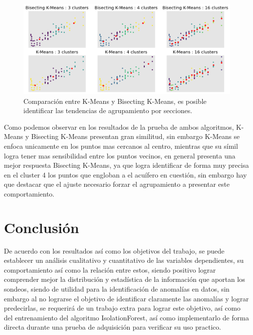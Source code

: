 \documentclass[sn-mathphys,Numbered]{sn-jnl}%
\theoremstyle{thmstyleone}%
\theoremstyle{thmstyletwo}%
\theoremstyle{thmstylethree}%
\begin{document}
\begin{figure}[H]
	\centering
	\includegraphics[width=1.1\linewidth]{imagenes/KMeans}
	\caption[Figura]{Comparación entre K-Means y Bisecting K-Means, es posible identificar las tendencias de agrupamiento por secciones.}
	\label{fig:KMeans}
\end{figure}

Como podemos observar en los resultados de la prueba de ambos algoritmos, K-Means y Bisecting K-Means presentan gran similitud, sin embargo K-Means se enfoca unicamente en los puntos mas cercanos al centro, mientras que su símil logra tener mas sensibilidad entre los puntos vecinos, en general presenta una mejor respuesta Bisecting K-Means, ya que logra identificar de forma muy precisa en el cluster 4 los puntos que engloban a el acuífero en cuestión, sin embargo hay que destacar que el ajuste necesario forzar el agrupamiento a presentar este comportamiento.

\section{Conclusión}\label{sec6}

De acuerdo con los resultados así como los objetivos del trabajo, se puede establecer un análisis cualitativo y cuantitativo de las variables dependientes, su comportamiento así como la relación entre estos, siendo positivo lograr comprender mejor la distribución y estadística de la información que aportan los sondeos, siendo de utilidad para la identificación de anomalías en datos, sin embargo al no lograrse el objetivo de identificar claramente las anomalías y lograr predecirlas, se requerirá de un trabajo extra para lograr este objetivo, así como del entrenamiento del algoritmo IsolationForest, así como implementarlo de forma directa durante una prueba de adquisición para verificar su uso practico.



\end{document}
